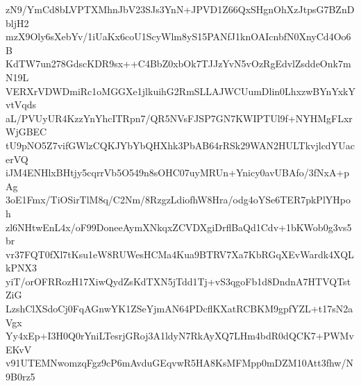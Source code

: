 zN9/YmCd8bLVPTXMhnJbV23SJs3YnN+JPVD1Z66QxSHgnOhXzJtpsG7BZnDbljH2
mzX9Oly6sXebYv/1iUaKx6coU1ScyWlm8yS15PANfJ1knOAIcnbfN0XnyCd4Oo6B
KdTW7un278GdscKDR9sx++C4BbZ0xbOk7TJJzYvN5vOzRgEdvlZsddeOnk7mN19L
VERXrVDWDmiRc1oMGGXe1jlkuihG2RmSLLAJWCUumDlin0LhxzwBYnYxkYvtVqds
aL/PVUyUR4KzzYnYhcITRpn7/QR5NVsFJSP7GN7KWIPTUl9f+NYHMgFLxrWjGBEC
tU9pNO5Z7vifGWlzCQKJYbYbQHXhk3PbAB64rRSk29WAN2HULTkvjlcdYUacerVQ
iJM4ENHlxBHtjy5cqrrVb5O549n8sOHC07uyMRUn+Ynicy0avUBAfo/3fNxA+pAg
3oE1Fmx/TiOSirTlM8q/C2Nm/8RzgzLdiofhW8Hra/odg4oYSe6TER7pkPlYHpoh
zl6NHtwEnL4x/oF99DoneeAymXNkqxZCVDXgiDrflBaQd1Cdv+1bKWob0g3vs5br
vr37FQT0fXl7tKsu1eW8RUWesHCMa4Kua9BTRV7Xa7KbRGqXEvWardk4XQLkPNX3
yiT/orOFRRozH17XiwQydZsKdTXN5jTdd1Tj+vS3qgoFb1d8DndnA7HTVQTstZiG
LzshClXSdoCj0FqAGnwYK1ZSeYjmAN64PDcflKXatRCBKM9gpfYZL+t17sN2aVgx
Yy4xEp+I3H0Q0rYniLTesrjGRoj3A1ldyN7RkAyXQ7LHm4bdR0dQCK7+PWMvEKvV
v91UTEMNwomzqFgz9cP6mAvduGEqvwR5HA8KsMFMpp0mDZM10Att3fhw/N9B0rz5
